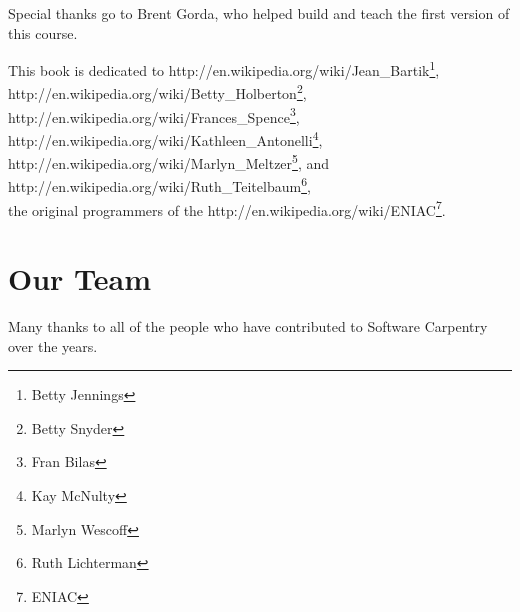 \documentclass[]{book}
\newcommand{\urlfoot}[2]{{#1}\footnote{#2}}
\begin{document}
Special thanks go to Brent Gorda, who helped build and teach the first
version of this course.

This book is dedicated to
\urlfoot{http://en.wikipedia.org/wiki/Jean_Bartik}{Betty Jennings},
\urlfoot{http://en.wikipedia.org/wiki/Betty_Holberton}{Betty Snyder},
\urlfoot{http://en.wikipedia.org/wiki/Frances_Spence}{Fran Bilas},
\urlfoot{http://en.wikipedia.org/wiki/Kathleen_Antonelli}{Kay McNulty},
\urlfoot{http://en.wikipedia.org/wiki/Marlyn_Meltzer}{Marlyn Wescoff}, and
\urlfoot{http://en.wikipedia.org/wiki/Ruth_Teitelbaum}{Ruth Lichterman}, \\
the original programmers of the
\urlfoot{http://en.wikipedia.org/wiki/ENIAC}{ENIAC}.

\section{Our Team}\label{our-team}

Many thanks to all of the people who have contributed to Software
Carpentry over the years.
\end{document}
